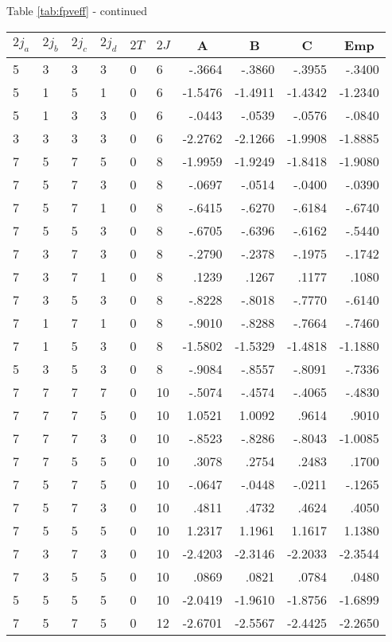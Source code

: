 \begin{center}{Table \ref{tab:fpveff} - continued}\end{center}
\clearpage
\small
\begin{center}
\begin{tabular}{llllllrrrr}
\hline
$2j_{a}$&$2j_{b}$&$2j_{c}$&$2j_{d}$&$2T$&$2J$&
\multicolumn{1}{c}{A}&
\multicolumn{1}{c}{B}&
\multicolumn{1}{c}{C}&
\multicolumn{1}{c}{Emp}\\
\hline
  5& 3& 3& 3& 0& 6&  -.3664&  -.3860&  -.3955&  -.3400\\
  5& 1& 5& 1& 0& 6& -1.5476& -1.4911& -1.4342& -1.2340\\
  5& 1& 3& 3& 0& 6&  -.0443&  -.0539&  -.0576&  -.0840\\
  3& 3& 3& 3& 0& 6& -2.2762& -2.1266& -1.9908& -1.8885\\
  7& 5& 7& 5& 0& 8& -1.9959& -1.9249& -1.8418& -1.9080\\
  7& 5& 7& 3& 0& 8&  -.0697&  -.0514&  -.0400&  -.0390\\
  7& 5& 7& 1& 0& 8&  -.6415&  -.6270&  -.6184&  -.6740\\
  7& 5& 5& 3& 0& 8&  -.6705&  -.6396&  -.6162&  -.5440\\
  7& 3& 7& 3& 0& 8&  -.2790&  -.2378&  -.1975&  -.1742\\
  7& 3& 7& 1& 0& 8&   .1239&   .1267&   .1177&   .1080\\
  7& 3& 5& 3& 0& 8&  -.8228&  -.8018&  -.7770&  -.6140\\
  7& 1& 7& 1& 0& 8&  -.9010&  -.8288&  -.7664&  -.7460\\
  7& 1& 5& 3& 0& 8& -1.5802& -1.5329& -1.4818& -1.1880\\
  5& 3& 5& 3& 0& 8&  -.9084&  -.8557&  -.8091&  -.7336\\
  7& 7& 7& 7& 0&10&  -.5074&  -.4574&  -.4065&  -.4830\\
  7& 7& 7& 5& 0&10&  1.0521&  1.0092&   .9614&   .9010\\
  7& 7& 7& 3& 0&10&  -.8523&  -.8286&  -.8043& -1.0085\\
  7& 7& 5& 5& 0&10&   .3078&   .2754&   .2483&   .1700\\
  7& 5& 7& 5& 0&10&  -.0647&  -.0448&  -.0211&  -.1265\\
  7& 5& 7& 3& 0&10&   .4811&   .4732&   .4624&   .4050\\
  7& 5& 5& 5& 0&10&  1.2317&  1.1961&  1.1617&  1.1380\\
  7& 3& 7& 3& 0&10& -2.4203& -2.3146& -2.2033& -2.3544\\
  7& 3& 5& 5& 0&10&   .0869&   .0821&   .0784&   .0480\\
  5& 5& 5& 5& 0&10& -2.0419& -1.9610& -1.8756& -1.6899\\
  7& 5& 7& 5& 0&12& -2.6701& -2.5567& -2.4425& -2.2650\\
\hline
\end{tabular}
\end{center}
